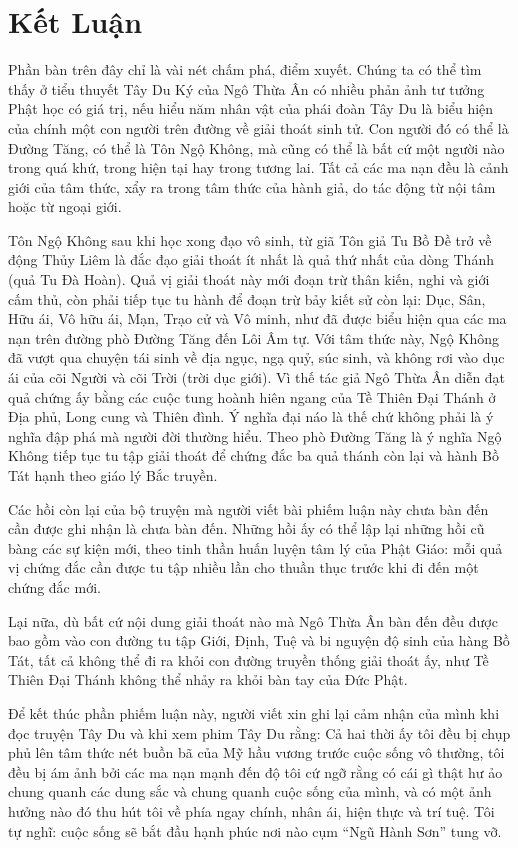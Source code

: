 \chapter{Kết Luận} %
\label{cha:ket_luan}

Phần bàn trên đây chỉ là vài nét chấm phá, điểm xuyết. Chúng ta có thể tìm thấy ở tiểu thuyết Tây Du Ký của Ngô Thừa Ân có nhiều phản ảnh tư tưởng Phật học có giá trị, nếu hiểu năm nhân vật của phái đoàn Tây Du là biểu hiện của chính một con người trên đường về giải thoát sinh tử. Con người đó có thể là Đường Tăng, có thể là Tôn Ngộ Không, mà cũng có thể là bất cứ một người nào trong quá khứ, trong hiện tại hay trong tương lai. Tất cả các ma nạn đều là cảnh giới của tâm thức, xẩy ra trong tâm thức của hành giả, do tác động từ nội tâm hoặc từ ngoại giới.

Tôn Ngộ Không sau khi học xong đạo vô sinh, từ giã Tôn giả Tu Bồ Đề trở về động Thủy Liêm là đắc đạo giải thoát ít nhất là quả thứ nhất của dòng Thánh (quả Tu Đà Hoàn). Quả vị giải thoát này mới đoạn trừ thân kiến, nghi và giới cấm thủ, còn phải tiếp tục tu hành để đoạn trừ bảy kiết sử còn lại: Dục, Sân, Hữu ái, Vô hữu ái, Mạn, Trạo cử và Vô minh, như đã được biểu hiện qua các ma nạn trên đường phò Đường Tăng đến Lôi Âm tự. Với tâm thức này, Ngộ Không đã vượt qua chuyện tái sinh về địa ngục, ngạ quỷ, súc sinh, và không rơi vào dục ái của cõi Người và cõi Trời (trời dục giới). Vì thế tác giả Ngô Thừa Ân diễn đạt quả chứng ấy bằng các cuộc tung hoành hiên ngang của Tề Thiên Đại Thánh ở Địa phủ, Long cung và Thiên đình. Ý nghĩa đại náo là thế chứ không phải là ý nghĩa đập phá mà người đời thường hiểu. Theo phò Đường Tăng là ý nghĩa Ngộ Không tiếp tục tu tập giải thoát để chứng đắc ba quả thánh còn lại và hành Bồ Tát hạnh theo giáo lý Bắc truyền.

Các hồi còn lại của bộ truyện mà người viết bài phiếm luận này chưa bàn đến cần được ghi nhận là chưa bàn đến. Những hồi ấy có thể lập lại những hồi cũ bàng các sự kiện mới, theo tinh thần huấn luyện tâm lý của Phật Giáo: mỗi quả vị chứng đắc cần được tu tập nhiều lần cho thuần thục trước khi đi đến một chứng đắc mới.

Lại nữa, dù bất cứ nội dung giải thoát nào mà Ngô Thừa Ân bàn đến đều được bao gồm vào con đường tu tập Giới, Định, Tuệ và bi nguyện độ sinh của hàng Bồ Tát, tất cả không thể đi ra khỏi con đường truyền thống giải thoát ấy, như Tề Thiên Đại Thánh không thể nhảy ra khỏi bàn tay của Đức Phật.

Để kết thúc phần phiếm luận này, người viết xin ghi lại cảm nhận của mình khi đọc truyện Tây Du và khi xem phim Tây Du rằng: Cả hai thời ấy tôi đều bị chụp phủ lên tâm thức nét buồn bã của Mỹ hầu vương trước cuộc sống vô thường, tôi đều bị ám ảnh bởi các ma nạn mạnh đến độ tôi cứ ngỡ rằng có cái gì thật hư ảo chung quanh các dung sắc và chung quanh cuộc sống của mình, và có một ảnh hưởng nào đó thu hút tôi về phía ngay chính, nhân ái, hiện thực và trí tuệ. Tôi tự nghĩ: cuộc sống sẽ bắt đầu hạnh phúc nơi nào cụm ``Ngũ Hành Sơn'' tung vỡ.
